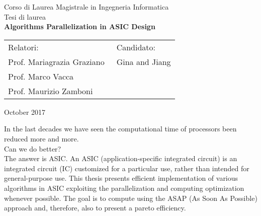 \documentclass[12pt]{report}
\begin{document}
	\pagestyle{empty}
	\begin{center}
		
		Corso di Laurea Magistrale in Ingegneria Informatica\\ %
		\vspace{1cm}
		{\large Tesi di laurea}\\
		\vspace{1cm}
		{\Large \textbf{Algorithms Parallelization in ASIC Design}}\\ %
	\end{center}
	\vspace{1cm}
	\begin{tabular}{l l}
		Relatori:  &  Candidato: \\ %
		Prof. Mariagrazia Graziano \hspace{6 cm}$\,$ & Gina and Jiang \\
		Prof. Marco Vacca \\
		Prof. Maurizio Zamboni
		
	\end{tabular}
	\vspace{1cm}
	\begin{center}
		October 2017 \\ %
	\end{center}
	\vspace{1cm}
	
	In the last decades we have seen the computational time of processors been reduced more and more.\\
	Can we do better?\\
	The answer is ASIC. An ASIC (application-specific integrated circuit) is an integrated circuit (IC) customized for a particular use, rather than intended for general-purpose use.
	This thesis presents efficient implementation of various algorithms in ASIC exploiting the parallelization and computing optimization whenever possible. The goal is to compute using the ASAP (As Soon As Possible) approach and, therefore, also to present a pareto efficiency. \\
	
\end{document}

